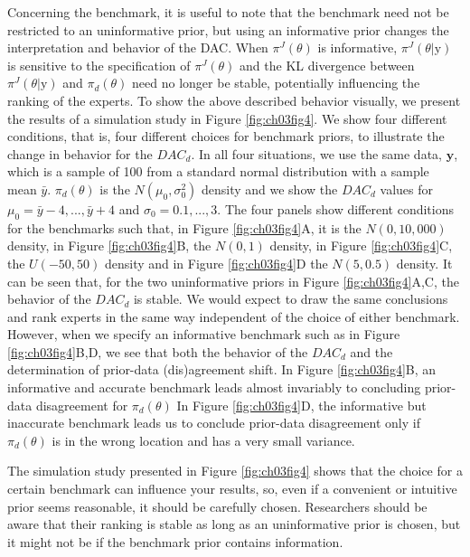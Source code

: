 \documentclass[openright,titlepage,12pt,a4paper]{book}
\begin{document}
Concerning the benchmark, it is useful to note that the benchmark need not be restricted to an uninformative prior, but using an informative prior changes the interpretation and behavior of the DAC. When \(\pi^J(\theta)\) is informative, \(\pi^J(\theta|\textrm{y})\) is sensitive to the specification of \(\pi^J(\theta)\) and the KL divergence between \(\pi^J(\theta|\textrm{y})\) and \(\pi_d(\theta)\) need no longer be stable, potentially influencing the ranking of the experts. To show the above described behavior visually, we present the results of a simulation study in Figure \ref{fig:ch03fig4}. We show four different conditions, that is, four different choices for benchmark priors, to illustrate the change in behavior for the \(DAC_d\). In all four situations, we use the same data, \(\textbf{y}\), which is a sample of 100 from a standard normal distribution with a sample mean \(\bar{y}\). \(\pi_d(\theta)\) is the \(N(\mu_0, \sigma^2_0)\) density and we show the \(DAC_d\) values for \(\mu_0 = \bar{y}-4,...,\bar{y}+4\) and \(\sigma_0 = 0.1,...,3\). The four panels show different conditions for the benchmarks such that, in Figure \ref{fig:ch03fig4}A, it is the \(N(0, 10,000)\) density, in Figure \ref{fig:ch03fig4}B, the \(N(0, 1)\) density, in Figure \ref{fig:ch03fig4}C, the \(U(-50, 50)\) density and in Figure \ref{fig:ch03fig4}D the \(N(5, 0.5)\) density. It can be seen that, for the two uninformative priors in Figure \ref{fig:ch03fig4}A,C, the behavior of the \(DAC_d\) is stable. We would expect to draw the same conclusions and rank experts in the same way independent of the choice of either benchmark. However, when we specify an informative benchmark such as in Figure \ref{fig:ch03fig4}B,D, we see that both the behavior of the \(DAC_d\) and the determination of prior-data (dis)agreement shift. In Figure \ref{fig:ch03fig4}B, an informative and accurate benchmark leads almost invariably to concluding prior-data disagreement for \(\pi_d(\theta)\) In Figure \ref{fig:ch03fig4}D, the informative but inaccurate benchmark leads us to conclude prior-data disagreement only if \(\pi_d(\theta)\) is in the wrong location and has a very small variance.

The simulation study presented in Figure \ref{fig:ch03fig4} shows that the choice for a certain benchmark can influence your results, so, even if a convenient or intuitive prior seems reasonable, it should be carefully chosen. Researchers should be aware that their ranking is stable as long as an uninformative prior is chosen, but it might not be if the benchmark prior contains information.
\end{document}
